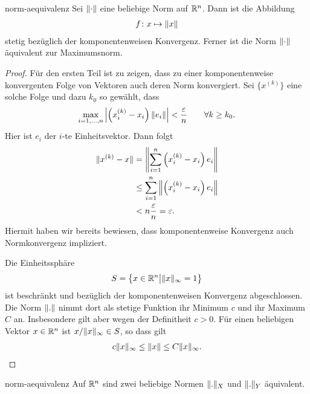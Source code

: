 \begin{Lemma}{norm-aequivalenz}
  Sei $\lVert\cdot\rVert$ eine beliebige Norm auf $\mathbb R^n$. Dann ist die Abbildung
  \begin{gather}
    f\colon x \mapsto \lVert x\rVert
  \end{gather}
  stetig bezüglich der komponentenweisen Konvergenz. Ferner ist die
  Norm $\lVert\cdot\rVert$ äquivalent zur Maximumsnorm.
\end{Lemma}

\begin{proof}
  Für den ersten Teil ist zu zeigen, dass zu einer komponentenweise
  konvergenten Folge von Vektoren auch deren Norm konvergiert. Sei
  $\{x^{(k)}\}$ eine solche Folge und dazu $k_0$ so gewählt, dass
  \begin{gather}
    \max_{i=1,\dots,n}\left\lvert\left(x_i^{(k)}-x_i\right) \lVert e_i\rVert\right\rvert
      < \frac{\varepsilon} n
    \qquad \forall k\ge k_0.
  \end{gather}
  Hier ist $e_i$ der $i$-te Einheitsvektor. Dann folgt
  \begin{align}
    \lVert x^{(k)}-x\rVert
    &= \left\lVert\sum_{i=1}^n \left(x_i^{(k)}-x_i\right) e_i\right\rVert
    \\
    &\le \sum_{i=1}^n \left\lVert\left(x_i^{(k)}-x_i\right) e_i\right\rVert
    \\
    & < n \frac{\varepsilon} n = \varepsilon.
  \end{align}
  Hiermit haben wir bereits bewiesen, dass komponentenweise Konvergenz
  auch Normkonvergenz impliziert.

  Die \glqq{}Einheitssphäre\grqq{}
   \begin{gather}
     S = \bigl\{ x\in \mathbb R^n \big| \lVert x\rVert_\infty = 1 \bigr\}
   \end{gather}
   ist beschränkt und bezüglich der komponentenweisen Konvergenz
   abgeschlossen. Die Norm $\lVert.\rVert$ nimmt dort als stetige Funktion
   ihr Minimum $c$ und ihr Maximum $C$ an. Insbesondere gilt aber
   wegen der Definitheit $c > 0$. Für einen beliebigen Vektor
   $x\in \mathbb R^n$ ist $x/\lVert x\rVert_\infty \in S$, so dass gilt
   \begin{gather}
     c \lVert x\rVert_\infty \le \lVert x\rVert \le C \lVert x\rVert_\infty.
   \end{gather}
\end{proof}

\begin{Satz}{norm-aequivalenz}
  Auf $\mathbb R^n$ sind zwei beliebige Normen $\lVert.\rVert_X$ und $\lVert.\rVert_Y$ äquivalent.
\end{Satz}

